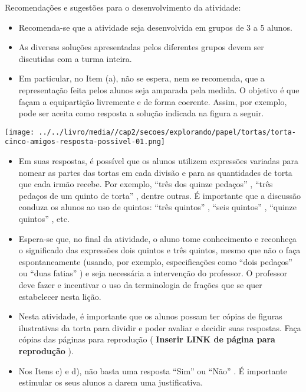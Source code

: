 \documentclass[oneside]{book}
\begin{document}
\begin{multicols}{2}
  Recomendações e sugestões para o desenvolvimento da atividade:
\begin{itemize} %
    \item       Recomenda-se que a atividade seja desenvolvida em grupos de 3 a 5 alunos.
    \item       As diversas soluções apresentadas pelos diferentes grupos devem ser discutidas com a turma inteira.
    \item       Em particular, no Item (a), não se espera, nem se recomenda, que a representação feita pelos alunos seja amparada pela medida. O objetivo é que façam a equipartição livremente e de forma coerente. Assim, por exemplo, pode ser aceita como resposta a solução indicada na figura a seguir.
\end{itemize} %


    \texttt{[image: ../../livro/media//cap2/secoes/explorando/papel/tortas/torta-cinco-amigos-resposta-possivel-01.png]}

\begin{itemize} %
    \item       Em suas respostas, é possível que os alunos utilizem expressões variadas para nomear as partes das tortas em cada divisão e para as quantidades de torta que cada irmão recebe. Por exemplo,       ``três dos quinze pedaços''      ,       ``três pedaços de um quinto de torta''      , dentre outras. É importante que a discussão conduza os alunos ao uso de quintos:       ``três quintos''      ,       ``seis quintos''      ,       ``quinze quintos''      , etc.
    \item       Espera-se que, no final da atividade, o aluno tome conhecimento e reconheça o significado das expressões dois quintos e três quintos, mesmo que não o faça espontaneamente (usando, por exemplo, especificações como       ``dois pedaços''       ou       ``duas fatias''      ) e seja necessária a intervenção do professor. O professor deve fazer e incentivar o uso da terminologia de frações que se quer estabelecer nesta lição.
    \item       Nesta atividade, é importante que os alunos possam ter cópias de figuras ilustrativas da torta para dividir e poder avaliar e decidir suas respostas. Faça cópias das páginas para reprodução (      {\bf Inserir LINK de página para reprodução}      ).
    \item       Nos Itens c) e d), não basta uma resposta       ``Sim''       ou       ``Não''      . É importante estimular os seus alunos a darem uma justificativa.
\end{itemize} %




\end{multicols}
\end{document}
